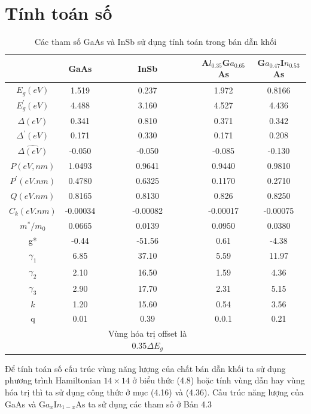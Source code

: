 \section{Tính toán số}
\begin{table}[ht]
\caption{Các tham số GaAs và InSb sử dụng tính toán trong bán dẫn khối}
\centering
\begin{tabular}{c c c c c}
\hline\hline %
  &GaAs &InSb &A$l_{0.35}$G$a_{0.65}$As &G$a_{0.47}$I$n_{0.53}$As\\[0.5ex]
\hline
$E_g (eV)$ &1.519 &0.237 &1.972 &0.8166\\
$E_g^{'} (eV)$ &4.488 &3.160 &4.527 &4.436\\
$\Delta(eV)$ &0.341 &0.810 &0.371 &0.342\\
$\Delta^{'}(eV)$ &0.171 &0.330 &0.171 &0.208\\
$\hat{\Delta (eV)}$ &-0.050 &-0.050 &-0.085 &-0.130\\
\hline
$P (eV,nm)$ &1.0493 &0.9641 &0.9440 &0.9810\\
$P^{'}(eV.nm)$ &0.4780 &0.6325 &0.1170 &0.2710\\
$Q (eV.nm)$ &0.8165 &0.8130 &0.826 &0.8250\\
$C_k (eV.nm)$ &-0.00034 &-0.00082 &-0.00017 &-0.00075\\
\hline
$m^{*}/m_0$ &0.0665 &0.0139 &0.0950 &0.0380 \\
g* &-0.44 &-51.56 &0.61 &-4.38\\
\hline
$\gamma_1$ &6.85 &37.10 &5.59 &11.97\\
$\gamma_2$ &2.10 &16.50 &1.59 &4.36\\
$\gamma_3$ &2.90 &17.70 &2.31 &5.15\\
$k$ &1.20 &15.60 &0.54 &3.56\\
q &0.01 &0.39 &0.0.1 &0.21\\
\hline\hline
& &Vùng hóa trị offset là 0.35$\Delta E_g$  &
\end{tabular}
\label{table:nonlin}
\end{table}
Để tính toán số cấu trúc vùng năng lượng của chất bán dẫn khối ta sử dụng phương trình Hamiltonian $14\times 14$ ở biểu thức (4.8) hoặc tính vùng dẫn hay vùng hóa trị thì ta sử dụng công thức ở mục (4.16) và (4.36). Cấu trúc năng lượng của GaAs và  G$a_x$I$n_{1-x}$As ta sử dụng các tham số ở Bản 4.3\\
